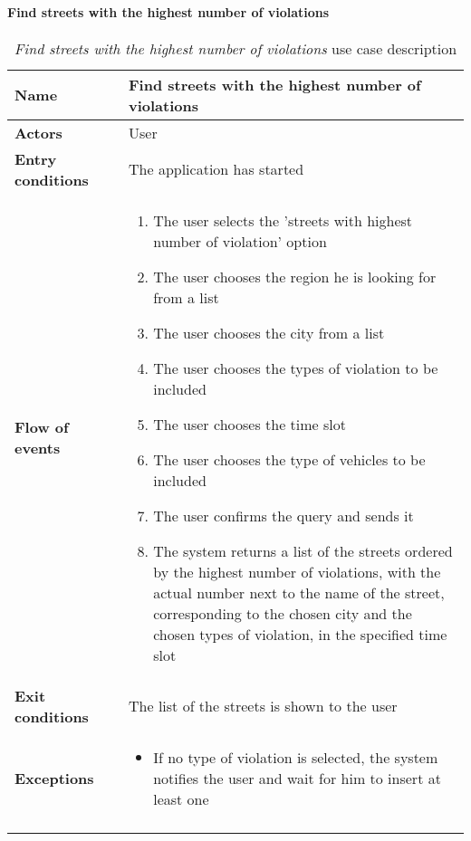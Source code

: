 		\paragraph{Find streets with the highest number of violations}
		\begin{longtable}{p{0.25\linewidth}p{0.75\linewidth}}
			\toprule
			\textbf{Name} & \textbf{Find streets with the highest number of violations} \\
			\midrule
			\textbf{Actors} & User \\
			\midrule
			\textbf{Entry conditions} & The application has started \\
			\midrule
			\textbf{Flow of events} & 
			\begin{enumerate}
				\item The user selects the 'streets with highest number of violation' option
				\item The user chooses the region he is looking for from a list
				\item The user chooses the city from a list
				\item The user chooses the types of violation to be included
				\item The user chooses the time slot
				\item The user chooses the type of vehicles to be included
				\item The user confirms the query and sends it
				\item The system returns a list of the streets ordered by the highest number of violations, with the actual number next to the name of the street, corresponding to the chosen city and the chosen types of violation, in the specified time slot
			\end{enumerate} \\
			\midrule
			\textbf{Exit conditions} & The list of the streets is shown to the user \\
			\midrule
			\textbf{Exceptions} & 
			\begin{itemize}
				\item 	If no type of violation is selected, the system notifies the user and wait for him to insert at least one	
			\end{itemize} \\
			\bottomrule
			\caption{\emph{Find streets with the highest number of violations} use case description}
		\end{longtable}
		

